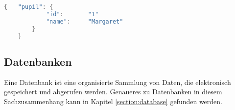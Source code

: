 \begin{lstlisting}[language=java,caption=JSON Beispiel,label=lst:impl:json]
    {   "pupil": {
            "id":       "1"
            "name":     "Margaret"
        }
    }
\end{lstlisting}

\subsection{Datenbanken}

Eine Datenbank ist eine organisierte Sammlung von Daten, die elektronisch gespeichert und abgerufen werden.
Genaueres zu Datenbanken in diesem Sachzusammenhang kann in Kapitel \ref{section:database} gefunden werden.
